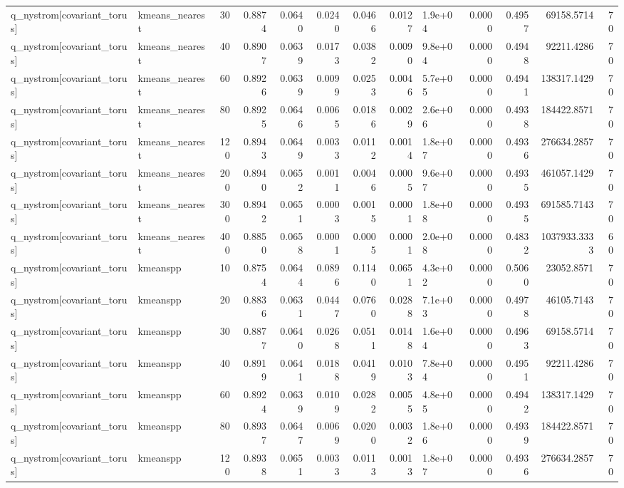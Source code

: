 \begin{table}
\begin{tabular}{llrrrrrrlrrrr}
q\_nystrom[covariant\_torus] & kmeans\_nearest & 30 & 0.8874 & 0.0640 & 0.0240 & 0.0466 & 0.0127 & 1.9e+04 & 0.0000 & 0.4957 & 69158.5714 & 70 \\
q\_nystrom[covariant\_torus] & kmeans\_nearest & 40 & 0.8907 & 0.0639 & 0.0173 & 0.0382 & 0.0090 & 9.8e+04 & 0.0000 & 0.4948 & 92211.4286 & 70 \\
q\_nystrom[covariant\_torus] & kmeans\_nearest & 60 & 0.8926 & 0.0639 & 0.0099 & 0.0253 & 0.0046 & 5.7e+05 & 0.0000 & 0.4941 & 138317.1429 & 70 \\
q\_nystrom[covariant\_torus] & kmeans\_nearest & 80 & 0.8925 & 0.0646 & 0.0065 & 0.0186 & 0.0029 & 2.6e+06 & 0.0000 & 0.4938 & 184422.8571 & 70 \\
q\_nystrom[covariant\_torus] & kmeans\_nearest & 120 & 0.8943 & 0.0649 & 0.0033 & 0.0112 & 0.0014 & 1.8e+07 & 0.0000 & 0.4936 & 276634.2857 & 70 \\
q\_nystrom[covariant\_torus] & kmeans\_nearest & 200 & 0.8940 & 0.0652 & 0.0011 & 0.0046 & 0.0005 & 9.6e+07 & 0.0000 & 0.4935 & 461057.1429 & 70 \\
q\_nystrom[covariant\_torus] & kmeans\_nearest & 300 & 0.8942 & 0.0651 & 0.0003 & 0.0015 & 0.0001 & 1.8e+08 & 0.0000 & 0.4935 & 691585.7143 & 70 \\
q\_nystrom[covariant\_torus] & kmeans\_nearest & 400 & 0.8850 & 0.0658 & 0.0001 & 0.0005 & 0.0001 & 2.0e+08 & 0.0000 & 0.4832 & 1037933.3333 & 60 \\
q\_nystrom[covariant\_torus] & kmeanspp & 10 & 0.8754 & 0.0644 & 0.0896 & 0.1140 & 0.0651 & 4.3e+02 & 0.0000 & 0.5060 & 23052.8571 & 70 \\
q\_nystrom[covariant\_torus] & kmeanspp & 20 & 0.8836 & 0.0631 & 0.0447 & 0.0760 & 0.0288 & 7.1e+03 & 0.0000 & 0.4978 & 46105.7143 & 70 \\
q\_nystrom[covariant\_torus] & kmeanspp & 30 & 0.8877 & 0.0640 & 0.0268 & 0.0511 & 0.0148 & 1.6e+04 & 0.0000 & 0.4963 & 69158.5714 & 70 \\
q\_nystrom[covariant\_torus] & kmeanspp & 40 & 0.8919 & 0.0641 & 0.0188 & 0.0419 & 0.0103 & 7.8e+04 & 0.0000 & 0.4951 & 92211.4286 & 70 \\
q\_nystrom[covariant\_torus] & kmeanspp & 60 & 0.8924 & 0.0639 & 0.0109 & 0.0282 & 0.0055 & 4.8e+05 & 0.0000 & 0.4942 & 138317.1429 & 70 \\
q\_nystrom[covariant\_torus] & kmeanspp & 80 & 0.8937 & 0.0647 & 0.0069 & 0.0200 & 0.0032 & 1.8e+06 & 0.0000 & 0.4939 & 184422.8571 & 70 \\
q\_nystrom[covariant\_torus] & kmeanspp & 120 & 0.8938 & 0.0651 & 0.0033 & 0.0113 & 0.0013 & 1.8e+07 & 0.0000 & 0.4936 & 276634.2857 & 70 \\

\end{tabular}
\end{table}
